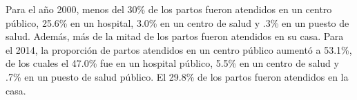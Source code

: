 Para el año 2000, menos del 30\% de los partos fueron atendidos en un centro público, 25.6\% en un hospital, 3.0\% en un centro de salud y .3\% en un puesto de salud. Además, más de la mitad de los partos fueron atendidos en su casa. Para el 2014, la proporción de partos atendidos en un centro público aumentó a 53.1\%, de los cuales el 47.0\% fue en un hospital público, 5.5\% en un centro de salud y .7\% en un puesto de salud público. El 29.8\% de los partos fueron atendidos en la casa.